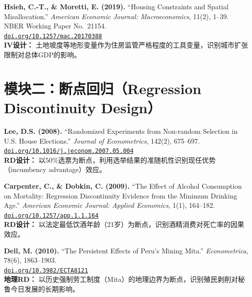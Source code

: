 \documentclass[12pt, a4paper]{article}
\begin{document}
\begin{enumerate}[label=\textbf{[\arabic*]}, leftmargin=*, itemsep=1em]
\item \textbf{Hsieh, C.-T., \& Moretti, E. (2019).}
  ``Housing Constraints and Spatial Misallocation.''
  \emph{American Economic Journal: Macroeconomics}, 11(2), 1--39.
  NBER Working Paper No.\ 21154.\\
  \href{https://doi.org/10.1257/mac.20170388}{\texttt{doi.org/10.1257/mac.20170388}}\\
  {\small \textcolor{asher}{\textbf{IV设计：} 土地坡度等地形变量作为住房监管严格程度的工具变量，识别城市扩张限制对总体GDP的影响。}}

\end{enumerate}

\section*{模块二：断点回归（Regression Discontinuity Design）}

\begin{enumerate}[label=\textbf{[\arabic*]}, leftmargin=*, itemsep=1em, start=7]

\item \textbf{Lee, D.S. (2008).}
  ``Randomized Experiments from Non-random Selection in U.S. House Elections.''
  \emph{Journal of Econometrics}, 142(2), 675--697.\\
  \href{https://doi.org/10.1016/j.jeconom.2007.05.004}{\texttt{doi.org/10.1016/j.jeconom.2007.05.004}}\\
  {\small \textcolor{asher}{\textbf{RD设计：} 以50\%选票为断点，利用选举结果的准随机性识别现任优势（incumbency advantage）效应。}}

\item \textbf{Carpenter, C., \& Dobkin, C. (2009).}
  ``The Effect of Alcohol Consumption on Mortality: Regression Discontinuity Evidence from the Minimum Drinking Age.''
  \emph{American Economic Journal: Applied Economics}, 1(1), 164--182.\\
  \href{https://doi.org/10.1257/app.1.1.164}{\texttt{doi.org/10.1257/app.1.1.164}}\\
  {\small \textcolor{asher}{\textbf{RD设计：} 以法定最低饮酒年龄（21岁）为断点，识别酒精消费对死亡率的因果效应。}}

\item \textbf{Dell, M. (2010).}
  ``The Persistent Effects of Peru's Mining Mita.''
  \emph{Econometrica}, 78(6), 1863--1903.\\
  \href{https://doi.org/10.3982/ECTA8121}{\texttt{doi.org/10.3982/ECTA8121}}\\
  {\small \textcolor{asher}{\textbf{地理RD：} 以历史强制劳工制度（Mita）的地理边界为断点，识别殖民剥削对秘鲁今日发展的长期影响。}}

\end{enumerate}
\end{document}

